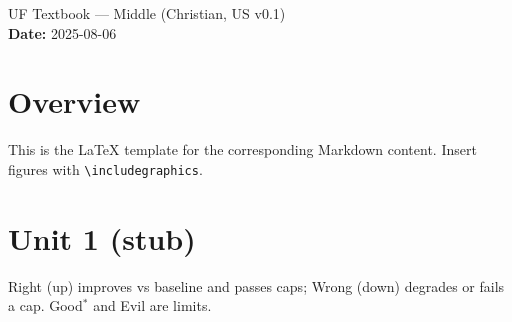 \documentclass[11pt]{article}
\begin{document}
\begin{center}
{\LARGE UF Textbook — Middle (Christian, US v0.1) }\\[6pt]
\textbf{Date: }2025-08-06
\end{center}

\section*{Overview}
This is the LaTeX template for the corresponding Markdown content. Insert figures with \texttt{\textbackslash includegraphics}.

\section*{Unit 1 (stub)}
Right (up) improves vs baseline and passes caps; Wrong (down) degrades or fails a cap. Good$^\ast$ and Evil are limits.
\end{document}
